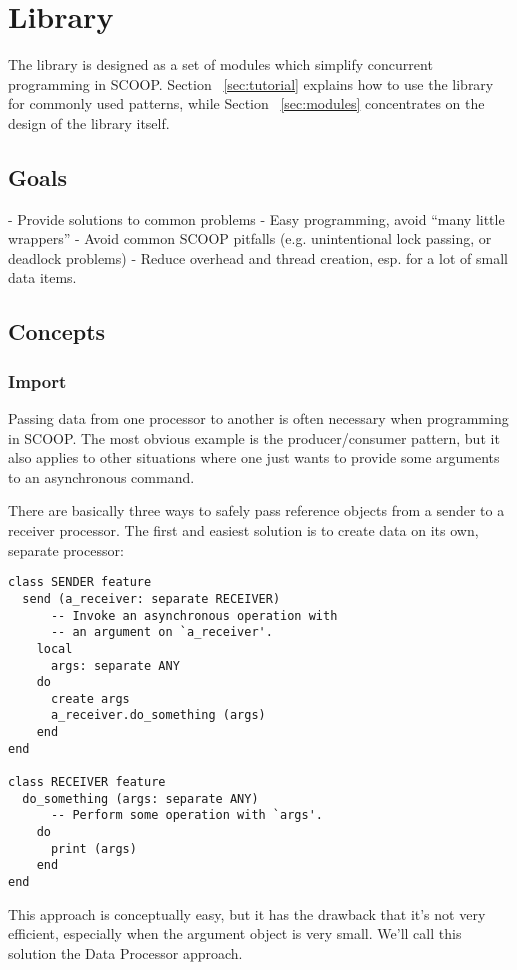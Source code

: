 \documentclass[a4paper,10pt]{report}
\begin{document}
\section {Library}

The library is designed as a set of modules which simplify concurrent programming in SCOOP.
Section ~\ref{sec:tutorial} explains how to use the library for commonly used patterns,
while Section ~\ref{sec:modules} concentrates on the design of the library itself.

\subsection{Goals}

- Provide solutions to common problems
- Easy programming, avoid ``many little wrappers''
- Avoid common SCOOP pitfalls (e.g. unintentional lock passing, or deadlock problems)
- Reduce overhead and thread creation, esp. for a lot of small data items.

\subsection{Concepts}

\subsubsection{Import}

Passing data from one processor to another is often necessary when programming in SCOOP.
The most obvious example is the producer/consumer pattern, but it also applies to other situations where one just wants to provide some arguments to an asynchronous command.

There are basically three ways to safely pass reference objects from a sender to a receiver processor.
The first and easiest solution is to create data on its own, separate processor: 
\begin{lstlisting}
class SENDER feature
  send (a_receiver: separate RECEIVER)
      -- Invoke an asynchronous operation with
      -- an argument on `a_receiver'.
    local
      args: separate ANY
    do
      create args
      a_receiver.do_something (args)
    end
end

class RECEIVER feature 
  do_something (args: separate ANY)
      -- Perform some operation with `args'.
    do
      print (args)
    end
end
\end{lstlisting}
This approach is conceptually easy, but it has the drawback that it's not very efficient, especially when the argument object is very small.
We'll call this solution the Data Processor approach.
\end{document}
